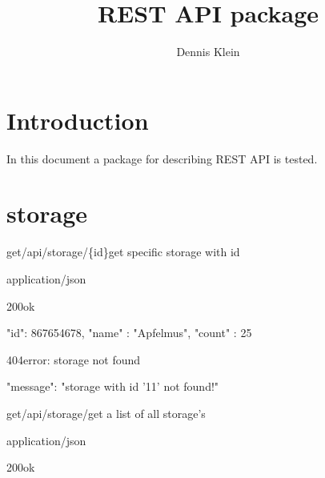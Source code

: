 \documentclass[12pt,a4paper]{article}
\title{REST API package}
\author{Dennis Klein}
\date{}
\begin{document}
\maketitle

\section{Introduction}
In this document a package for describing REST API is tested. 

\pagebreak

\section{storage}

\begin{apiRoute}{get}{/api/storage/\{id\}}{get specific storage with id}
	
	\begin{routeParameter}
	\end{routeParameter}
	\begin{routeResponse}{application/json}
		\begin{routeResponseItem}{200}{ok}
			\begin{routeResponseItemBody}
{     
	"id": 867654678,
	"name" : "Apfelmus",
	"count" : 25
}
			\end{routeResponseItemBody}
		\end{routeResponseItem}
		\begin{routeResponseItem}{404}{error: storage not found}
			\begin{routeResponseItemBody}
{
	"message": "storage with id '11' not found!"
}
			\end{routeResponseItemBody}
		\end{routeResponseItem}
	\end{routeResponse}
	
\end{apiRoute}



\begin{apiRoute}{get}{/api/storage/}{get a list of all storage's}
	\begin{routeParameter}
		\noRouteParamter{no parameter}
	\end{routeParameter}
	\begin{routeResponse}{application/json}
		\begin{routeResponseItem}{200}{ok}
			\begin{routeResponseItemBody}
			\end{routeResponseItemBody}
		\end{routeResponseItem}
	\end{routeResponse}
\end{apiRoute}
\end{document}
